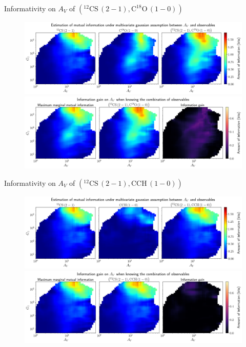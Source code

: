 \documentclass{beamer}
\begin{document}
\begin{frame}{Informativity on $A_V$ of $\left(\mathrm{^{12}CS\,(2-1)},\mathrm{C^{18}O\,(1-0)}\right)$}
    \begin{figure}
        \centering
        \includegraphics[width=0.95\linewidth]{../linearinfo/av__12cs21_c18o10_linearinfo.png}
        \vfill
        \includegraphics[width=0.95\linewidth]{../linearinfo/av__12cs21_c18o10_linearinfo_gain.png}
    \end{figure}
\end{frame}

\begin{frame}{Informativity on $A_V$ of $\left(\mathrm{^{12}CS\,(2-1)},\mathrm{CCH\,(1-0)}\right)$}
    \begin{figure}
        \centering
        \includegraphics[width=0.95\linewidth]{../linearinfo/av__12cs21_cch10_linearinfo.png}
        \vfill
        \includegraphics[width=0.95\linewidth]{../linearinfo/av__12cs21_cch10_linearinfo_gain.png}
    \end{figure}
\end{frame}
\end{document}
